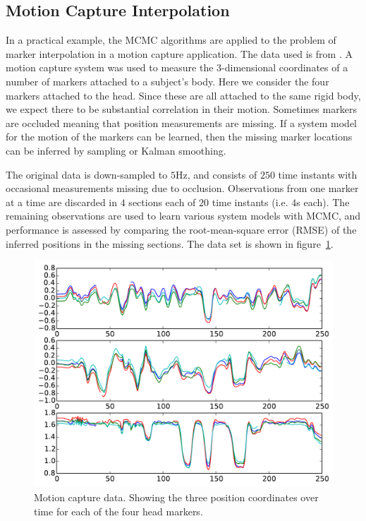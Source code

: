 \documentclass[journal,10pt]{IEEEtran}
\begin{document}
\subsection{Motion Capture Interpolation} \label{sec:mocap}

In a practical example, the MCMC algorithms are applied to the problem of marker interpolation in a motion capture application. The data used is from \cite{Aristidou2013}. A motion capture system was used to measure the $3$-dimensional coordinates of a number of markers attached to a subject's body. Here we consider the four markers attached to the head. Since these are all attached to the same rigid body, we expect there to be substantial correlation in their motion. Sometimes markers are occluded meaning that position measurements are missing. If a system model for the motion of the markers can be learned, then the missing marker locations can be inferred by sampling or Kalman smoothing.

The original data is down-sampled to $5$Hz, and consists of $250$ time instants with occasional measurements missing due to occlusion. Observations from one marker at a time are discarded in $4$ sections each of $20$ time instants (i.e. $4$s each). The remaining observations are used to learn various system models with MCMC, and performance is assessed by comparing the root-mean-square error (RMSE) of the inferred positions in the missing sections. The data set is shown in figure~\ref{fig:mocap_data}.

\begin{figure}
 \centering
 \includegraphics[width=0.9\columnwidth]{figures/mocap-data.pdf}
 \caption{Motion capture data. Showing the three position coordinates over time for each of the four head markers.}
 \label{fig:mocap_data}
\end{figure}
\end{document}
